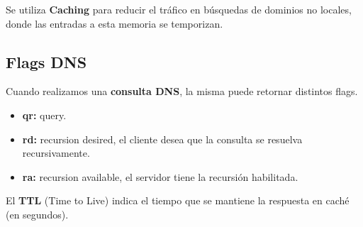Se utiliza \textbf{Caching} para reducir el tráfico en búsquedas de dominios no locales, donde las entradas a esta memoria se temporizan.  

\subsection{Flags DNS}

Cuando realizamos una \textbf{consulta DNS}, la misma puede retornar distintos flags.

\begin{itemize}[leftmargin=*, label=\textcolor{acento}{$\bullet$}]
    \item \textbf{qr:} query.
    \item \textbf{rd:} recursion desired, el cliente desea que la consulta se resuelva recursivamente.
    \item \textbf{ra:} recursion available, el servidor tiene la recursión habilitada.
\end{itemize}

El \textbf{TTL} (Time to Live) indica el tiempo que se mantiene la respuesta en caché (en segundos).

